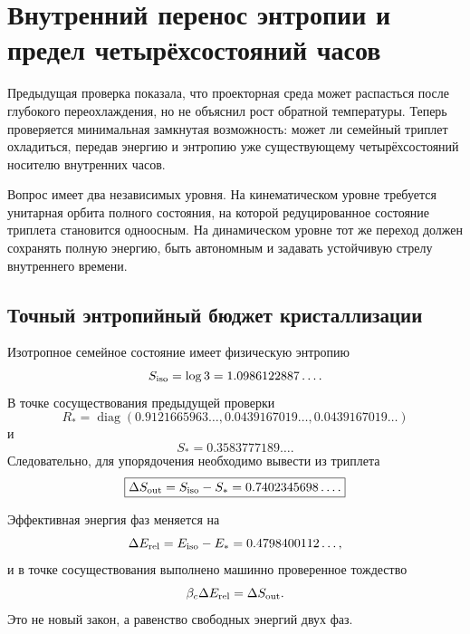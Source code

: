 \chapter{Внутренний перенос энтропии и предел четырёхсостояний часов}

Предыдущая проверка показала, что проекторная среда может распасться после
глубокого переохлаждения, но не объяснил рост обратной температуры.
Теперь проверяется минимальная замкнутая возможность: может ли семейный
триплет охладиться, передав энергию и энтропию уже существующему
четырёхсостояний носителю внутренних часов.

Вопрос имеет два независимых уровня. На кинематическом уровне требуется
унитарная орбита полного состояния, на которой редуцированное состояние
триплета становится одноосным. На динамическом уровне тот же переход
должен сохранять полную энергию, быть автономным и задавать устойчивую
стрелу внутреннего времени.

\section{Точный энтропийный бюджет кристаллизации}

Изотропное семейное состояние имеет физическую энтропию
\begin{equation}
 S_{\rm iso}=\log3=1.0986122887\ldots.
\end{equation}
В точке сосуществования предыдущей проверки
\begin{equation}
 R_*=\operatorname{diag}
 (0.9121665963\ldots,0.0439167019\ldots,0.0439167019\ldots)
\end{equation}
и
\begin{equation}
 S_*=0.3583777189\ldots.
\end{equation}
Следовательно, для упорядочения необходимо вывести из триплета
\begin{equation}
 \boxed{\Delta S_{\rm out}=S_{\rm iso}-S_*
 =0.7402345698\ldots.}
 \label{eq:v6-ordering-entropy-export}
\end{equation}

Эффективная энергия фаз меняется на
\begin{equation}
 \Delta E_{\rm rel}=E_{\rm iso}-E_*
 =0.4798400112\ldots,
 \label{eq:v6-ordering-energy-release}
\end{equation}
и в точке сосуществования выполнено машинно проверенное тождество
\begin{equation}
 \beta_c\Delta E_{\rm rel}=\Delta S_{\rm out}.
 \label{eq:v6-coexistence-entropy-energy-identity}
\end{equation}
Это не новый закон, а равенство свободных энергий двух фаз.

